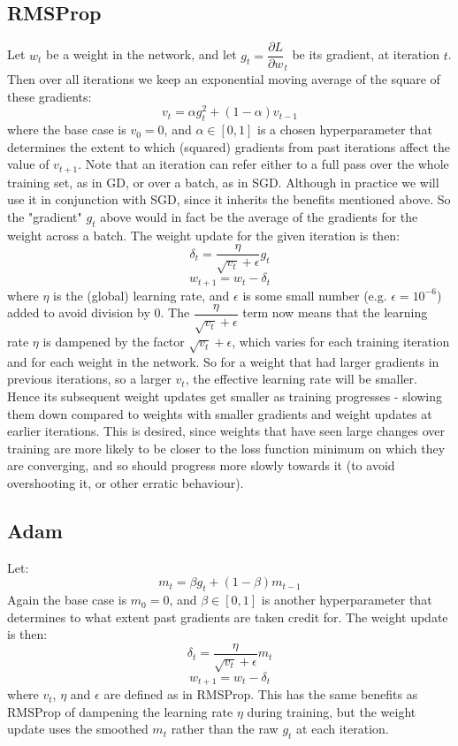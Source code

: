 \documentclass[11pt]{article} %
\theoremstyle{plain}
\theoremstyle{definition}
\begin{document}
\subsection{RMSProp} \label{RMSProp}
Let \(w_t\) be a weight in the network, and let \(g_t = {\dfrac{\partial L}{\partial w}}_t\) be its gradient, at iteration \(t\). Then over all iterations we keep an exponential moving average of the square of these gradients:
\[ v_t = \alpha g_t^2 + (1-\alpha)v_{t-1} \]
where the base case is \(v_0 = 0\), and \( \alpha \in [0,1]\) is a chosen hyperparameter that determines the extent to which (squared) gradients from past iterations affect the value of \(v_{t+1}\). Note that an iteration can refer either to a full pass over the whole training set, as in GD, or over a batch, as in SGD. Although in practice we will use it in conjunction with SGD, since it inherits the benefits mentioned above. So the "gradient" \(g_t\) above would in fact be the average of the gradients for the weight across a batch. The weight update for the given iteration is then:
\[ \delta_t  = \dfrac{\eta}{\sqrt{v_t} + \epsilon} g_t \]
\[ w_{t+1} = w_t - \delta_t \]
where \(\eta\) is the (global) learning rate, and \(\epsilon\) is some small number (e.g. \(\epsilon=10^{-6}\)) added to avoid division by 0. The \(\dfrac{\eta}{\sqrt{v_t} + \epsilon}\) term now means that the learning rate \(\eta\) is dampened by the factor \(\sqrt{v_t} + \epsilon\), which varies for each training iteration and for each weight in the network. So for a weight that had larger gradients in previous iterations, so a larger \(v_t\), the effective learning rate will be smaller. Hence its subsequent weight updates get smaller as training progresses - slowing them down compared to weights with smaller gradients and weight updates at earlier iterations. This is desired, since weights that have seen large changes over training are more likely to be closer to the loss function minimum on which they are converging, and so should progress more slowly towards it (to avoid overshooting it, or other erratic behaviour).

\subsection{Adam} \label{Adam}
Let:
\[ m_t = \beta g_t + (1-\beta)m_{t-1} \]
Again the base case is \(m_0=0\), and \( \beta \in [0,1]\) is another hyperparameter that determines to what extent past gradients are taken credit for. The weight update is then:
\[ \delta_t  = \dfrac{\eta}{\sqrt{v_t} + \epsilon} m_t \]
\[ w_{t+1} = w_t - \delta_t \]
where \(v_t\), \(\eta\) and \(\epsilon\) are defined as in RMSProp. This has the same benefits as RMSProp of dampening the learning rate \(\eta\) during training, but the weight update uses the smoothed \(m_t\) rather than the raw \(g_t\) at each iteration. 
\end{document}
